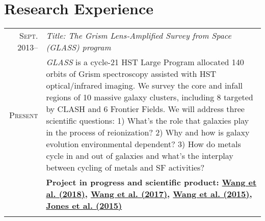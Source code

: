 \documentclass[letterpaper,10pt]{article}
\newcommand{\narrow}{-1.8ex}
\begin{document}
\section{Research Experience}
\vspace{-.8em}
\begin{longtable}{r|p{5.6in}}

  \textsc{Sept. 2013}--  &   \emph{Title: The Grism Lens-Amplified Survey from Space (GLASS) program}   \\
  \textsc{Present}       &   \small{\textit{GLASS} is a cycle-21 HST Large Program allocated 140 orbits of
  Grism spectroscopy assisted with HST optical/infrared imaging. We survey the core and infall regions of 10
  massive galaxy clusters, including 8 targeted by CLASH and 6 Frontier Fields. We will address three
  scientific questions: 1) What's the role that galaxies play in the process of reionization? 2) Why and how
  is galaxy evolution environmental dependent? 3) How do metals cycle in and out of galaxies and what's the
  interplay between cycling of metals and SF activities?}   \\
  & \textbf{Project in progress and scientific product:
        \hyperlink{18.wang.apj}{Wang et al. (2018)},
        \hyperlink{17.wang.apj}{Wang et al. (2017)},
        \hyperlink{15.wang.apj}{Wang et al. (2015)},
        \hyperlink{15.jones.aj}{Jones et al. (2015)}} \\
  \multicolumn{2}{c}{} \\[\narrow]



\end{longtable}
\end{document}
